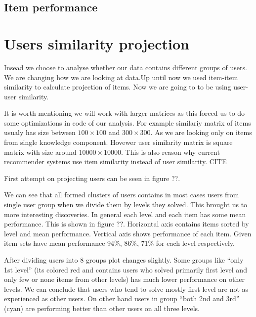 \documentclass[
  digital, %
  table,   %
  nolof,     %
  nolot,     %
  nocover
]{fithesis3}
\begin{document}
\subsection{Item performance}





















\section{Users similarity
projection}\label{users-similarity-projection}

Insead we choose to analyse whether our data contains different groups
of users. We are changing how we are looking at data.Up until now we
used item-item similarity to calculate projection of items. Now we are
going to to be using user-user similarity.

It is worth mentioning we will work with larger matrices as this forced
us to do some optimizations in code of our analysis. For example
similariy matrix of items usualy has size between $100\times 100$ and
$300\times 300$. As we are looking only on items from single knowledge
component. Hovewer user similarity matrix is square matrix with size
around $10 000\times 10 000$. This is also reason why current
recommender systems use item similarity instead of user similarity. CITE

First attempt on projecting users can be seen in figure ??.


We can see that all formed clusters of users contains in most cases users
from single user group when we divide them by levels they solved. This
brought us to more interesting discoveries. In general each level and
each item has some mean performance. This is shown in figure ??.
Horizontal axis contains items sorted by level and mean performance.
Vertical axis shows performance of each item. Given item sets have mean
performance 94\%, 86\%, 71\% for each level respectively.

After dividing users into 8 groups plot changes slightly. Some groups
like ``only 1st level'' (its colored red and contains users who solved
primarily first level and only few or none items from other levels) has
much lower performance on other levels. We can conclude that users who
tend to solve mostly first level are not as experienced as other users. On
other hand users in group ``both 2nd and 3rd'' (cyan) are performing
better than other users on all three levels.
\end{document}
